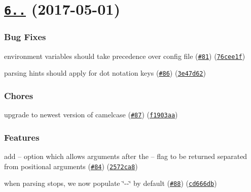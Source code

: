 \label{_6.0.0}%
 \section*{\href{https://github.com/yargs/yargs-parser/compare/v4.2.1...v6.0.0}{\tt 6..} (2017-\/05-\/01)}

\subsubsection*{Bug Fixes}


\begin{DoxyItemize}
\item environment variables should take precedence over config file (\href{https://github.com/yargs/yargs-parser/issues/81}{\tt \#81}) (\href{https://github.com/yargs/yargs-parser/commit/76cee1f}{\tt 76cee1f})
\item parsing hints should apply for dot notation keys (\href{https://github.com/yargs/yargs-parser/issues/86}{\tt \#86}) (\href{https://github.com/yargs/yargs-parser/commit/3e47d62}{\tt 3e47d62})
\end{DoxyItemize}

\subsubsection*{Chores}


\begin{DoxyItemize}
\item upgrade to newest version of camelcase (\href{https://github.com/yargs/yargs-parser/issues/87}{\tt \#87}) (\href{https://github.com/yargs/yargs-parser/commit/f1903aa}{\tt f1903aa})
\end{DoxyItemize}

\subsubsection*{Features}


\begin{DoxyItemize}
\item add -- option which allows arguments after the -- flag to be returned separated from positional arguments (\href{https://github.com/yargs/yargs-parser/issues/84}{\tt \#84}) (\href{https://github.com/yargs/yargs-parser/commit/2572ca8}{\tt 2572ca8})
\item when parsing stops, we now populate \char`\"{}-\/-\/\char`\"{} by default (\href{https://github.com/yargs/yargs-parser/issues/88}{\tt \#88}) (\href{https://github.com/yargs/yargs-parser/commit/cd666db}{\tt cd666db})
\end{DoxyItemize}


